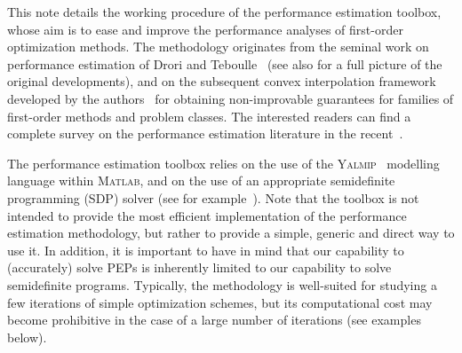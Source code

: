 \documentclass[11pt,a4paper]{article}
\begin{document}
This note details the working procedure of the performance estimation toolbox, whose aim is to ease and improve the performance analyses of first-order optimization methods. The methodology originates from the seminal work on performance estimation of Drori and Teboulle~\cite{Article:Drori} (see also \cite{drori2014contributions} for a full picture of the original developments), and on the subsequent convex interpolation framework developed by the authors~\cite{taylor2015smooth,taylor2015exact} for obtaining non-improvable guarantees for families of first-order methods and problem classes. The interested readers can find a complete survey on the performance estimation literature in the recent~\cite{Taylor2017PEPs}.

The performance estimation toolbox relies on the use of the \textsc{Yalmip}~\cite{Article:Yalmip} modelling language within \textsc{Matlab}, and on the use of an appropriate semidefinite programming (SDP) solver (see for example~\cite{Article:Sedumi,Article:Mosek,Article:sdpt3}). Note that the toolbox is not intended to provide the most efficient implementation of the performance estimation methodology, but rather to provide a simple, generic and direct way to use it. In addition, it is important to have in mind that our capability to (accurately) solve PEPs is inherently limited to our capability to solve semidefinite programs. Typically, the methodology is well-suited for studying a few iterations of simple optimization schemes, but its computational cost may become prohibitive in the case of a large number of iterations (see examples below). 
\end{document}
